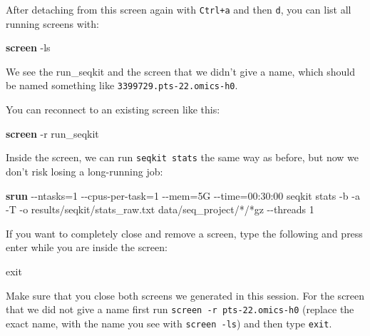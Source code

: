 \documentclass[
  letterpaper,
  DIV=11,
  numbers=noendperiod]{scrreprt}
\newenvironment{Shaded}{}{}
\newcommand{\AttributeTok}[1]{\textcolor[rgb]{0.84,0.23,0.29}{#1}}
\newcommand{\BuiltInTok}[1]{\textcolor[rgb]{0.84,0.23,0.29}{#1}}
\newcommand{\ExtensionTok}[1]{\textcolor[rgb]{0.84,0.23,0.29}{\textbf{#1}}}
\newcommand{\NormalTok}[1]{\textcolor[rgb]{0.14,0.16,0.18}{#1}}
\newcommand{\OperatorTok}[1]{\textcolor[rgb]{0.14,0.16,0.18}{#1}}
\newcommand{\PreprocessorTok}[1]{\textcolor[rgb]{0.84,0.23,0.29}{#1}}
\begin{document}
\begin{tcolorbox}
After detaching from this screen again with \texttt{Ctrl+a} and then
\texttt{d}, you can list all running screens with:

\begin{Shaded}
\begin{Highlighting}[]
\ExtensionTok{screen} \AttributeTok{{-}ls}
\end{Highlighting}
\end{Shaded}

We see the run\_seqkit and the screen that we didn't give a name, which
should be named something like \texttt{3399729.pts-22.omics-h0}.

You can reconnect to an existing screen like this:

\begin{Shaded}
\begin{Highlighting}[]
\ExtensionTok{screen} \AttributeTok{{-}r}\NormalTok{ run\_seqkit}
\end{Highlighting}
\end{Shaded}

Inside the screen, we can run \texttt{seqkit\ stats} the same way as
before, but now we don't risk losing a long-running job:

\begin{Shaded}
\begin{Highlighting}[]
\ExtensionTok{srun} \AttributeTok{{-}{-}ntasks}\OperatorTok{=}\NormalTok{1 }\AttributeTok{{-}{-}cpus{-}per{-}task}\OperatorTok{=}\NormalTok{1 }\AttributeTok{{-}{-}mem}\OperatorTok{=}\NormalTok{5G }\AttributeTok{{-}{-}time}\OperatorTok{=}\NormalTok{00:30:00 seqkit stats }\AttributeTok{{-}b} \AttributeTok{{-}a} \AttributeTok{{-}T} \AttributeTok{{-}o}\NormalTok{ results/seqkit/stats\_raw.txt data/seq\_project/}\PreprocessorTok{*}\NormalTok{/}\PreprocessorTok{*}\NormalTok{gz }\AttributeTok{{-}{-}threads}\NormalTok{ 1}
\end{Highlighting}
\end{Shaded}

If you want to completely close and remove a screen, type the following
and press enter while you are inside the screen:

\begin{Shaded}
\begin{Highlighting}[]
\BuiltInTok{exit}
\end{Highlighting}
\end{Shaded}

Make sure that you close both screens we generated in this session. For
the screen that we did not give a name first run
\texttt{screen\ -r\ pts-22.omics-h0} (replace the exact name, with the
name you see with \texttt{screen\ -ls}) and then type \texttt{exit}.

\end{tcolorbox}
\end{document}
